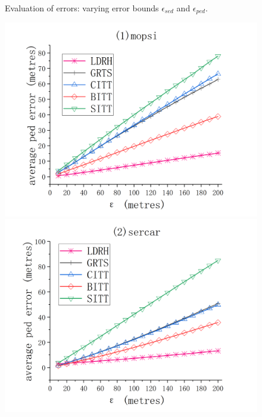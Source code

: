 {{\begin{figure}[tb!]
	\vspace{-2ex}
	\caption{\small Evaluation of \sed errors: varying error bounds $\epsilon_{sed}$ and $\epsilon_{ped}$.}
	\label{fig:sed-error}
	\vspace{-1ex}
\end{figure}

\begin{figure}[tb!]
	\centering
	\includegraphics[scale = 0.555]{figures/Fig-mopsi-ped-error.png}\hspace{0ex}
	\includegraphics[scale = 0.555]{figures/Fig-sercar-ped-error.png}\hspace{0ex}

\end{figure}}}
